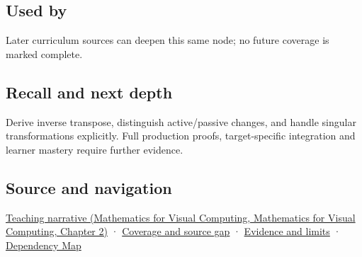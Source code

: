 \subsection{Used by}\label{appendix-46da295c6787-used-by}

Later curriculum sources can deepen this same node; no future coverage is marked complete.

\subsection{Recall and next depth}\label{appendix-46da295c6787-recall-and-next-depth}

Derive inverse transpose, distinguish active/passive changes, and handle singular transformations explicitly. Full production proofs, target-specific integration and learner mastery require further evidence.

\subsection{Source and navigation}\label{appendix-46da295c6787-source-and-navigation}

\href{../02-Mathematics-for-Visual-Computing/main.pdf\#nameddest=01-foundations-i-ch018-a-normal-is-a-measuring-rule-before-it-is-an-arrow}{Teaching narrative (Mathematics for Visual Computing, Mathematics for Visual Computing, Chapter 2)} · \hyperref[appendix-fd090d982a15-phase-6---parts-501-600]{Coverage and source gap} · \hyperref[appendix-a103e7846d21-phase-6---source-analysis-and-verification]{Evidence and limits} · \hyperref[appendix-4ad47bdd269a]{Dependency Map}
